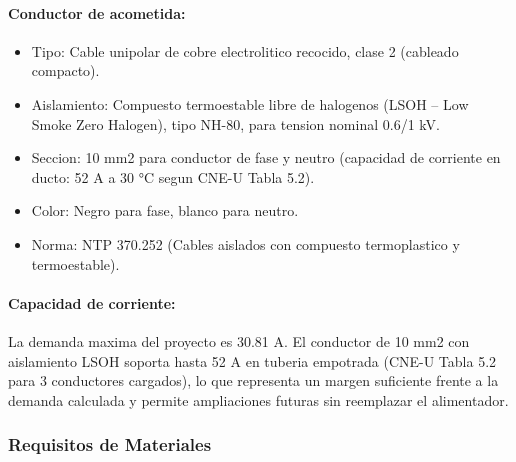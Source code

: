 \paragraph{Conductor de acometida:}
\begin{itemize}[nosep]
  \item Tipo: Cable unipolar de cobre electrolitico recocido, clase 2 (cableado compacto).
  \item Aislamiento: Compuesto termoestable libre de halogenos (LSOH -- Low Smoke Zero Halogen), tipo NH-80, para tension nominal 0.6/1 kV.
  \item Seccion: 10 mm2 para conductor de fase y neutro (capacidad de corriente en ducto: 52 A a 30 °C segun CNE-U Tabla 5.2).
  \item Color: Negro para fase, blanco para neutro.
  \item Norma: NTP 370.252 (Cables aislados con compuesto termoplastico y termoestable).
\end{itemize}

\paragraph{Capacidad de corriente:}
La demanda maxima del proyecto es 30.81 A. El conductor de 10 mm2 con aislamiento LSOH soporta hasta 52 A en tuberia empotrada (CNE-U Tabla 5.2 para 3 conductores cargados), lo que representa un margen suficiente frente a la demanda calculada y permite ampliaciones futuras sin reemplazar el alimentador.

\subsubsection{Requisitos de Materiales}


